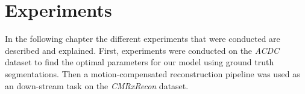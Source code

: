 \documentclass[english,version-2022-01]{uzl-thesis} %
\begin{document}
\section{Experiments} \label{Sec:Experiments}
In the following chapter the different experiments that were conducted are described and explained. 
First, experiments were conducted on the \emph{ACDC} dataset to find the optimal parameters for our model using ground truth segmentations. Then a motion-compensated reconstruction pipeline was used as an down-stream task on the \emph{CMRxRecon} dataset.


\end{document}

